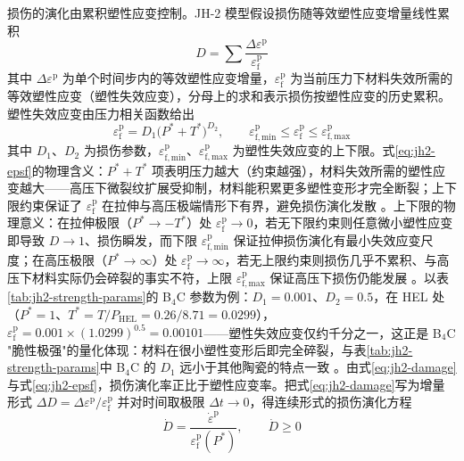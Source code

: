 损伤的演化由累积塑性应变控制。JH-2 模型假设损伤随等效塑性应变增量线性累积
\begin{equation}
  D=\sum\frac{\Delta\varepsilon^{\mathrm{p}}}{\varepsilon^{\mathrm{p}}_{\mathrm{f}}}
  \label{eq:jh2-damage}
\end{equation}
其中 $\Delta\varepsilon^{\mathrm{p}}$ 为单个时间步内的等效塑性应变增量，$\varepsilon^{\mathrm{p}}_{\mathrm{f}}$ 为当前压力下材料失效所需的等效塑性应变（塑性失效应变），分母上的求和表示损伤按塑性应变的历史累积。塑性失效应变由压力相关函数给出
\begin{equation}
  \varepsilon^{\mathrm{p}}_{\mathrm{f}}
  =D_{1}\bigl(P^{*}+T^{*}\bigr)^{D_{2}},
  \qquad
  \varepsilon^{\mathrm{p}}_{\mathrm{f,min}}\le\varepsilon^{\mathrm{p}}_{\mathrm{f}}
  \le\varepsilon^{\mathrm{p}}_{\mathrm{f,max}}
  \label{eq:jh2-epsf}
\end{equation}
其中 $D_{1}$、$D_{2}$ 为损伤参数，$\varepsilon^{\mathrm{p}}_{\mathrm{f,min}}$、$\varepsilon^{\mathrm{p}}_{\mathrm{f,max}}$ 为塑性失效应变的上下限。式\eqref{eq:jh2-epsf}的物理含义：$P^{*}+T^{*}$ 项表明压力越大（约束越强），材料失效所需的塑性应变越大——高压下微裂纹扩展受抑制，材料能积累更多塑性变形才完全断裂；上下限约束保证了 $\varepsilon^{\mathrm{p}}_{\mathrm{f}}$ 在拉伸与高压极端情形下有界，避免损伤演化发散 \cite{JohnsonHolmquist1994,JohnsonHolmquist1999}。上下限的物理意义：在拉伸极限（$P^{*}\to-T^{*}$）处 $\varepsilon^{\mathrm{p}}_{\mathrm{f}}\to0$，若无下限约束则任意微小塑性应变即导致 $D\to1$、损伤瞬发，而下限 $\varepsilon^{\mathrm{p}}_{\mathrm{f,min}}$ 保证拉伸损伤演化有最小失效应变尺度；在高压极限（$P^{*}\to\infty$）处 $\varepsilon^{\mathrm{p}}_{\mathrm{f}}\to\infty$，若无上限约束则损伤几乎不累积、与高压下材料实际仍会碎裂的事实不符，上限 $\varepsilon^{\mathrm{p}}_{\mathrm{f,max}}$ 保证高压下损伤仍能发展 \cite{JohnsonHolmquist1994}。以表\ref{tab:jh2-strength-params}的 B$_{4}$C 参数为例：$D_{1}=0.001$、$D_{2}=0.5$，在 HEL 处（$P^{*}=1$、$T^{*}=T/P_{\mathrm{HEL}}=0.26/8.71=0.0299$），$\varepsilon^{\mathrm{p}}_{\mathrm{f}}=0.001\times(1.0299)^{0.5}=0.00101$——塑性失效应变仅约千分之一，这正是 B$_{4}$C "脆性极强"的量化体现：材料在很小塑性变形后即完全碎裂，与表\ref{tab:jh2-strength-params}中 B$_{4}$C 的 $D_{1}$ 远小于其他陶瓷的特点一致 \cite{JohnsonHolmquist1999}。由式\eqref{eq:jh2-damage}与式\eqref{eq:jh2-epsf}，损伤演化率正比于塑性应变率。把式\eqref{eq:jh2-damage}写为增量形式 $\Delta D=\Delta\varepsilon^{\mathrm{p}}/\varepsilon^{\mathrm{p}}_{\mathrm{f}}$ 并对时间取极限 $\Delta t\to0$，得连续形式的损伤演化方程
\begin{equation}
  \dot{D}
  =\frac{\dot{\varepsilon}^{\mathrm{p}}}{\varepsilon^{\mathrm{p}}_{\mathrm{f}}(P^{*})},
  \qquad
  \dot{D}\ge0
  \label{eq:jh2-damage-rate}
\end{equation}
